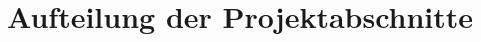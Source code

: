 \documentclass[./dokumentation.tex]{subfiles}
\begin{document}
\section{Aufteilung der Projektabschnitte}
\end{document}
